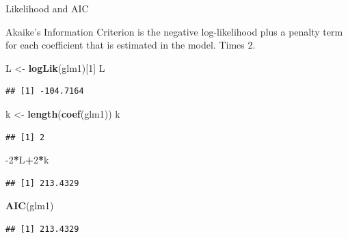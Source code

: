\documentclass[
  ignorenonframetext,
]{beamer}
\newenvironment{Shaded}{\begin{snugshade}}{\end{snugshade}}
\newcommand{\DecValTok}[1]{\textcolor[rgb]{0.00,0.00,0.81}{#1}}
\newcommand{\KeywordTok}[1]{\textcolor[rgb]{0.13,0.29,0.53}{\textbf{#1}}}
\newcommand{\NormalTok}[1]{#1}
\newcommand{\OperatorTok}[1]{\textcolor[rgb]{0.81,0.36,0.00}{\textbf{#1}}}
\newcommand{\StringTok}[1]{\textcolor[rgb]{0.31,0.60,0.02}{#1}}
\begin{document}
\begin{frame}[fragile]{Likelihood and AIC}
\protect\hypertarget{likelihood-and-aic}{}

Akaike's Information Criterion is the negative log-likelihood plus a
penalty term for each coefficient that is estimated in the model. Times
2.

\begin{Shaded}
\begin{Highlighting}[]
\NormalTok{L <-}\StringTok{ }\KeywordTok{logLik}\NormalTok{(glm1)[}\DecValTok{1}\NormalTok{]}
\NormalTok{L}
\end{Highlighting}
\end{Shaded}

\begin{verbatim}
## [1] -104.7164
\end{verbatim}

\begin{Shaded}
\begin{Highlighting}[]
\NormalTok{k <-}\StringTok{ }\KeywordTok{length}\NormalTok{(}\KeywordTok{coef}\NormalTok{(glm1))}
\NormalTok{k}
\end{Highlighting}
\end{Shaded}

\begin{verbatim}
## [1] 2
\end{verbatim}

\begin{Shaded}
\begin{Highlighting}[]
\DecValTok{-2}\OperatorTok{*}\NormalTok{L}\OperatorTok{+}\DecValTok{2}\OperatorTok{*}\NormalTok{k}
\end{Highlighting}
\end{Shaded}

\begin{verbatim}
## [1] 213.4329
\end{verbatim}

\begin{Shaded}
\begin{Highlighting}[]
\KeywordTok{AIC}\NormalTok{(glm1)}
\end{Highlighting}
\end{Shaded}

\begin{verbatim}
## [1] 213.4329
\end{verbatim}

\end{frame}
\end{document}
